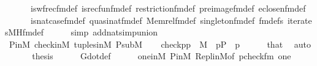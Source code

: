 \begin{isabellebody}
\ \ \ \ \ \ is{\isacharunderscore}{\kern0pt}wfrec{\isacharunderscore}{\kern0pt}fm{\isacharunderscore}{\kern0pt}def\ is{\isacharunderscore}{\kern0pt}recfun{\isacharunderscore}{\kern0pt}fm{\isacharunderscore}{\kern0pt}def\ restriction{\isacharunderscore}{\kern0pt}fm{\isacharunderscore}{\kern0pt}def\ pre{\isacharunderscore}{\kern0pt}image{\isacharunderscore}{\kern0pt}fm{\isacharunderscore}{\kern0pt}def\ eclose{\isacharunderscore}{\kern0pt}n{\isacharunderscore}{\kern0pt}fm{\isacharunderscore}{\kern0pt}def\isanewline
\ \ \ \ \ \ is{\isacharunderscore}{\kern0pt}nat{\isacharunderscore}{\kern0pt}case{\isacharunderscore}{\kern0pt}fm{\isacharunderscore}{\kern0pt}def\ quasinat{\isacharunderscore}{\kern0pt}fm{\isacharunderscore}{\kern0pt}def\ Memrel{\isacharunderscore}{\kern0pt}fm{\isacharunderscore}{\kern0pt}def\ singleton{\isacharunderscore}{\kern0pt}fm{\isacharunderscore}{\kern0pt}def\ fm{\isacharunderscore}{\kern0pt}defs\ iterates{\isacharunderscore}{\kern0pt}MH{\isacharunderscore}{\kern0pt}fm{\isacharunderscore}{\kern0pt}def\isanewline
\ \ \ \ \isamarkupfalse%
\ {\isacharparenleft}{\kern0pt}simp\ add{\isacharcolon}{\kern0pt}nat{\isacharunderscore}{\kern0pt}simp{\isacharunderscore}{\kern0pt}union{\isacharparenright}{\kern0pt}\isanewline
\ \ \isamarkupfalse%
\isanewline
\ \ \isamarkupfalse%
\ P{\isacharunderscore}{\kern0pt}in{\isacharunderscore}{\kern0pt}M\ check{\isacharunderscore}{\kern0pt}in{\isacharunderscore}{\kern0pt}M\ tuples{\isacharunderscore}{\kern0pt}in{\isacharunderscore}{\kern0pt}M\ P{\isacharunderscore}{\kern0pt}sub{\isacharunderscore}{\kern0pt}M\isanewline
\ \ \isamarkupfalse%
\ {\isachardoublequoteopen}{\isasymlangle}check{\isacharparenleft}{\kern0pt}p{\isacharparenright}{\kern0pt}{\isacharcomma}{\kern0pt}p{\isasymrangle}\ {\isasymin}\ M{\isachardoublequoteclose}\ \ {\isachardoublequoteopen}p{\isasymin}P{\isachardoublequoteclose}\ \ p\isanewline
\ \ \ \ \isamarkupfalse%
\ that\ \isamarkupfalse%
\ auto\isanewline
\ \ \isamarkupfalse%
\isanewline
\ \ \isamarkupfalse%
\ {\isacharquery}{\kern0pt}thesis\isanewline
\ \ \ \ \isamarkupfalse%
\ G{\isacharunderscore}{\kern0pt}dot{\isacharunderscore}{\kern0pt}def\isanewline
\ \ \ \ \isamarkupfalse%
\ one{\isacharunderscore}{\kern0pt}in{\isacharunderscore}{\kern0pt}M\ P{\isacharunderscore}{\kern0pt}in{\isacharunderscore}{\kern0pt}M\ Repl{\isacharunderscore}{\kern0pt}in{\isacharunderscore}{\kern0pt}M{\isacharbrackleft}{\kern0pt}of\ {\isacharquery}{\kern0pt}pcheck{\isacharunderscore}{\kern0pt}fm\ {\isachardoublequoteopen}{\isacharbrackleft}{\kern0pt}one{\isacharbrackright}{\kern0pt}{\isachardoublequoteclose}{\isacharbrackright}{\kern0pt}\isanewline

\end{isabellebody}
